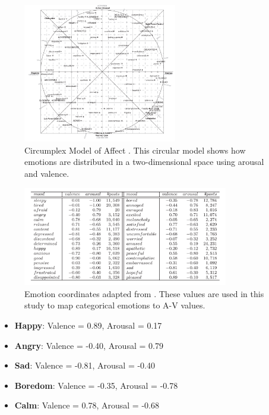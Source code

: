 \begin{figure}[H]
    \centering
    \includegraphics[width=0.6\textwidth]{img/chapter_03/circumplex_model.png}
    \caption{Circumplex Model of Affect \cite{russell1980circumplex}. This circular model shows how emotions are distributed in a two-dimensional space using arousal and valence.}
    \label{fig:circumplex_model}
\end{figure}

\begin{figure}[H]
    \centering
    \includegraphics[width=0.8\textwidth]{img/chapter_03/emotion_coordinates_table.png}
    \caption{Emotion coordinates adapted from \cite{paltoglou2012seeing}. These values are used in this study to map categorical emotions to A-V values.}
    \label{fig:emotion_coordinates}
\end{figure}


\begin{itemize}
    \item \textbf{Happy}: Valence = 0.89, Arousal = 0.17
    \item \textbf{Angry}: Valence = -0.40, Arousal = 0.79
    \item \textbf{Sad}: Valence = -0.81, Arousal = -0.40
    \item \textbf{Boredom}: Valence = -0.35, Arousal = -0.78
    \item \textbf{Calm}: Valence = 0.78, Arousal = -0.68
\end{itemize}

